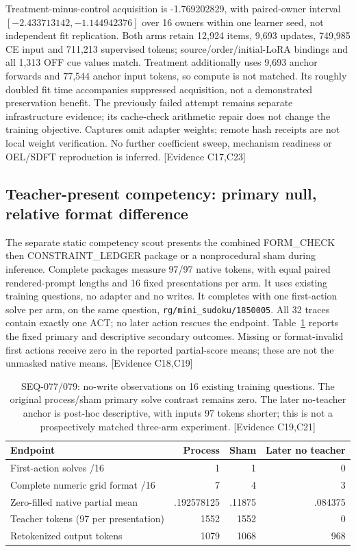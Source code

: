 \documentclass[11pt]{article}
\newcommand{\ev}[1]{\textsf{[Evidence #1]}}
\begin{document}
Treatment-minus-control acquisition is -1.769202829, with paired-owner interval
$[-2.433713142,-1.144942376]$ over 16 owners within one learner seed, not
independent fit replication. Both arms retain 12,924 items, 9,693 updates,
749,985 CE input and 711,213 supervised tokens; source/order/initial-LoRA
bindings and all 1,313 OFF cue values match. Treatment additionally uses 9,693
anchor forwards and 77,544 anchor input tokens, so compute is not matched.
Its roughly doubled fit time accompanies suppressed acquisition, not a
demonstrated preservation benefit. The previously failed attempt remains
separate infrastructure evidence; its cache-check arithmetic repair does not
change the training objective. Captures omit adapter weights; remote hash
receipts are not local weight verification. No further coefficient sweep,
mechanism readiness or OEL/SDFT reproduction is inferred. \ev{C17,C23}

\subsection{Teacher-present competency: primary null, relative format difference}
The separate static competency scout presents the combined
FORM\_CHECK then CONSTRAINT\_LEDGER package or a nonprocedural sham during
inference. Complete packages measure 97/97 native tokens, with equal paired
rendered-prompt lengths and 16 fixed presentations per arm. It uses existing
training questions, no adapter and no writes. It completes with one first-action
solve per arm, on the same question, \texttt{rg/mini\_sudoku/1850005}.
All 32 traces contain exactly one ACT; no later action rescues the endpoint.
Table~\ref{tab:competency} reports the fixed primary and descriptive secondary
outcomes. Missing or format-invalid first actions receive zero in the reported
partial-score means; these are not the unmasked native means. \ev{C18,C19}

\begin{table}[ht]
\centering
\begin{tabular}{lrrr}
\toprule
Endpoint & Process & Sham & Later no teacher \\
\midrule
First-action solves /16 & 1 & 1 & 0 \\
Complete numeric grid format /16 & 7 & 4 & 3 \\
Zero-filled native partial mean & .192578125 & .11875 & .084375 \\
Teacher tokens (97 per presentation) & 1552 & 1552 & 0 \\
Retokenized output tokens & 1079 & 1068 & 968 \\
\bottomrule
\end{tabular}
\caption{SEQ-077/079: no-write observations on 16 existing training questions.
The original process/sham primary solve contrast remains zero. The later
no-teacher anchor is post-hoc descriptive, with inputs 97 tokens shorter; this
is not a prospectively matched three-arm experiment. \ev{C19,C21}}
\label{tab:competency}
\end{table}
\end{document}
